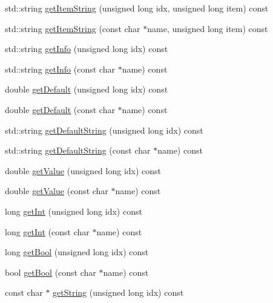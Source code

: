 \begin{DoxyCompactItemize}
\item 
std\+::string \hyperlink{class_frame_lib___parameters_a19f6d2862f0b6c2a9fffa496362beef1}{get\+Item\+String} (unsigned long idx, unsigned long item) const
\item 
std\+::string \hyperlink{class_frame_lib___parameters_a5cda6528deb6a8a306b6de6f7eeaa2fb}{get\+Item\+String} (const char $\ast$name, unsigned long item) const
\item 
std\+::string \hyperlink{class_frame_lib___parameters_a6e90c72b4f3ece2ab4fe7dd893d399e3}{get\+Info} (unsigned long idx) const
\item 
std\+::string \hyperlink{class_frame_lib___parameters_aa278b4f3ac4bb743e2941fd004748133}{get\+Info} (const char $\ast$name) const
\item 
double \hyperlink{class_frame_lib___parameters_a6d28eb24ae285237724b2249f342c3d8}{get\+Default} (unsigned long idx) const
\item 
double \hyperlink{class_frame_lib___parameters_a2524dc5f2566eb521f95a342eb980239}{get\+Default} (const char $\ast$name) const
\item 
std\+::string \hyperlink{class_frame_lib___parameters_aa6544b983343464c17299ab6f1874bce}{get\+Default\+String} (unsigned long idx) const
\item 
std\+::string \hyperlink{class_frame_lib___parameters_aa8481b077e92ff7548123b97411280a1}{get\+Default\+String} (const char $\ast$name) const
\item 
double \hyperlink{class_frame_lib___parameters_a64dc41237eccad96a857b4f675f4054d}{get\+Value} (unsigned long idx) const
\item 
double \hyperlink{class_frame_lib___parameters_afa54042c7a35164482fcba5112bd3e24}{get\+Value} (const char $\ast$name) const
\item 
long \hyperlink{class_frame_lib___parameters_adc9dcbcbf2ac23f0e15a35db8090aa88}{get\+Int} (unsigned long idx) const
\item 
long \hyperlink{class_frame_lib___parameters_a31833d0ce833197dbde6346159bf3222}{get\+Int} (const char $\ast$name) const
\item 
long \hyperlink{class_frame_lib___parameters_ad27a46c31a31f42a6efb7c29c6937595}{get\+Bool} (unsigned long idx) const
\item 
bool \hyperlink{class_frame_lib___parameters_adb0e6fa234026a2cd72eb5baed059b30}{get\+Bool} (const char $\ast$name) const
\item 
const char $\ast$ \hyperlink{class_frame_lib___parameters_a9853e712e3ee11410175d6e3028d862a}{get\+String} (unsigned long idx) const

\end{DoxyCompactItemize}
